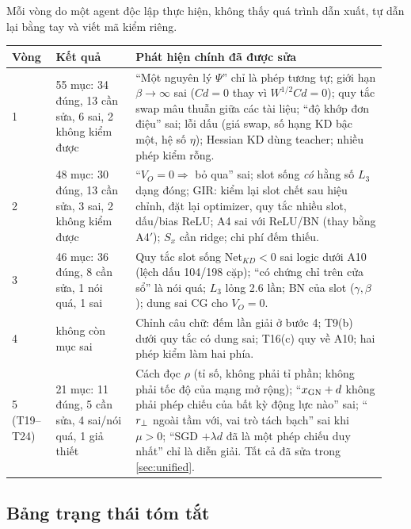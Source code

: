 Mỗi vòng do một agent độc lập thực hiện, không thấy quá trình dẫn xuất, tự dẫn lại bằng tay và viết mã kiểm riêng.

\begin{longtable}{@{}p{0.11\linewidth}p{0.2\linewidth}p{0.63\linewidth}@{}}
\toprule
Vòng & Kết quả & Phát hiện chính đã được sửa \\
\midrule
\endhead
1 & 55 mục: 34 đúng, 13 cần sửa, 6 sai, 2 không kiểm được & ``Một nguyên lý $\Psi$'' chỉ là phép tương tự; giới hạn $\beta\to\infty$ sai ($Cd=0$ thay vì $W^{1/2}Cd=0$); quy tắc swap mâu thuẫn giữa các tài liệu; ``độ khớp đơn điệu'' sai; lỗi dấu (giá swap, số hạng KD bậc một, hệ số $\eta$); Hessian KD dùng teacher; nhiều phép kiểm rỗng. \\
2 & 48 mục: 30 đúng, 13 cần sửa, 3 sai, 2 không kiểm được & ``$V_O=0\Rightarrow$ bỏ qua'' sai; slot sống \emph{có} hằng số $L_3$ dạng đóng; GIR: kiểm lại slot chết sau hiệu chỉnh, đặt lại optimizer, quy tắc nhiều slot, dấu/bias ReLU; A4 sai với ReLU/BN (thay bằng A4$'$); $S_x$ cần ridge; chi phí đếm thiếu. \\
3 & 46 mục: 36 đúng, 8 cần sửa, 1 nói quá, 1 sai & Quy tắc slot sống Net$_{KD}<0$ sai logic dưới A10 (lệch dấu 104/198 cặp); ``có chứng chỉ trên cửa sổ'' là nói quá; $L_3$ lỏng 2.6 lần; BN của slot ($\gamma,\beta$); dung sai CG cho $V_O=0$. \\
4 & không còn mục sai & Chỉnh câu chữ: đếm lần giải ở bước 4; T9(b) dưới quy tắc có dung sai; T16(c) quy về A10; hai phép kiểm làm hai phía. \\
5 (T19--T24) & 21 mục: 11 đúng, 5 cần sửa, 4 sai/nói quá, 1 giả thiết & Cách đọc $\rho$ (tỉ số, không phải tỉ phần; không phải tốc độ của mạng mở rộng); ``$x_{\mathrm{GN}}+d$ không phải phép chiếu của bất kỳ động lực nào'' sai; ``$r_{\perp}$ ngoài tầm với, vai trò tách bạch'' sai khi $\mu>0$; ``SGD $+\lambda d$ đã là một phép chiếu duy nhất'' chỉ là diễn giải. Tất cả đã sửa trong \cref{sec:unified}. \\
\bottomrule
\end{longtable}

\subsection{Bảng trạng thái tóm tắt}

